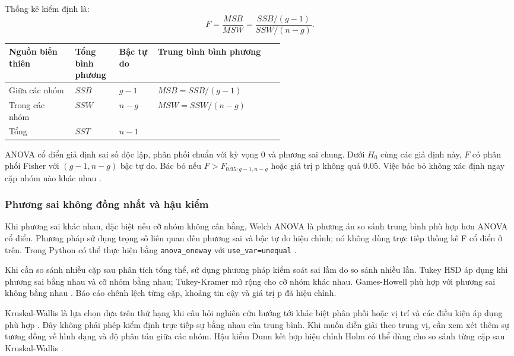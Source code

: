 Thống kê kiểm định là:
\nopagebreak[4]
\[F=\frac{MSB}{MSW}=\frac{SSB/(g-1)}{SSW/(n-g)}.\]


\begin{center}
\small
\renewcommand{\arraystretch}{1.22}
\begin{tabularx}{\linewidth}{@{}L{0.24\linewidth} C{0.16\linewidth} C{0.14\linewidth} X@{}}
\toprule
{}
\textbf{Nguồn biến thiên} & \textbf{Tổng bình phương} & \textbf{Bậc tự do} & \textbf{Trung bình bình phương} \\
\midrule
Giữa các nhóm & $SSB$ & $g-1$ & $MSB=SSB/(g-1)$ \\
Trong các nhóm & $SSW$ & $n-g$ & $MSW=SSW/(n-g)$ \\
Tổng & $SST$ & $n-1$ & \\
\bottomrule
\end{tabularx}
\end{center}


ANOVA cổ điển giả định sai số độc lập, phân phối chuẩn với kỳ vọng 0 và phương sai chung. Dưới \(H_0\) cùng các giả định này, \(F\) có phân phối Fisher với \((g-1,n-g)\) bậc tự do. Bác bỏ nếu \(F>F_{0.95;g-1,n-g}\) hoặc giá trị p không quá 0.05. Việc bác bỏ không xác định ngay cặp nhóm nào khác nhau \cite{ref7}.

\subsubsection{Phương sai không đồng nhất và hậu kiểm}

Khi phương sai khác nhau, đặc biệt nếu cỡ nhóm không cân bằng, Welch ANOVA là phương án so sánh trung bình phù hợp hơn ANOVA cổ điển. Phương pháp sử dụng trọng số liên quan đến phương sai và bậc tự do hiệu chỉnh; nó không dùng trực tiếp thống kê F cổ điển ở trên. Trong Python có thể thực hiện bằng \texttt{anova\_oneway} với \texttt{use\_var=\textquotesingle{}unequal\textquotesingle{}} \cite{ref8}.

Khi cần so sánh nhiều cặp sau phân tích tổng thể, sử dụng phương pháp kiểm soát sai lầm do so sánh nhiều lần. Tukey HSD áp dụng khi phương sai bằng nhau và cỡ nhóm bằng nhau; Tukey-Kramer mở rộng cho cỡ nhóm khác nhau. Games-Howell phù hợp với phương sai không bằng nhau \cite{ref9}. Báo cáo chênh lệch từng cặp, khoảng tin cậy và giá trị p đã hiệu chỉnh.

Kruskal-Wallis là lựa chọn dựa trên thứ hạng khi câu hỏi nghiên cứu hướng tới khác biệt phân phối hoặc vị trí và các điều kiện áp dụng phù hợp \cite{ref10}. Đây không phải phép kiểm định trực tiếp sự bằng nhau của trung bình. Khi muốn diễn giải theo trung vị, cần xem xét thêm sự tương đồng về hình dạng và độ phân tán giữa các nhóm. Hậu kiểm Dunn kết hợp hiệu chỉnh Holm có thể dùng cho so sánh từng cặp sau Kruskal-Wallis \cite{ref11}.

